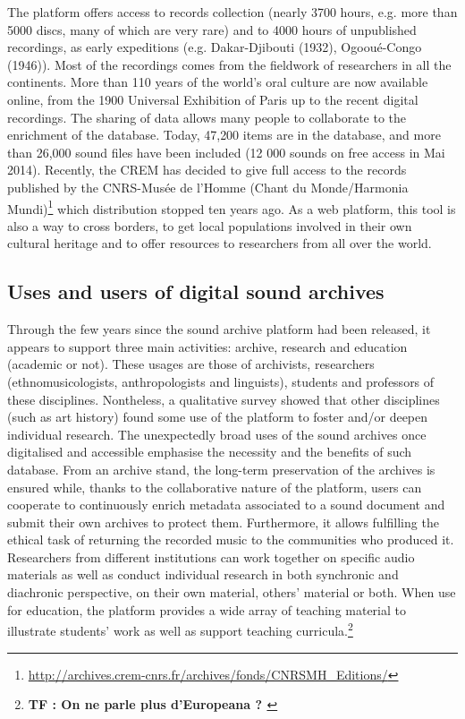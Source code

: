 \documentclass{sig-alternate}
\newcommand{\comment}[1]{\footnote{\color{red} \bf{{#1}}}}
\begin{document}
The platform offers access to records collection (nearly 3700 hours, e.g. more than 5000 discs, many of which are very rare) and to 4000 hours of unpublished recordings, as early expeditions (e.g. Dakar-Djibouti (1932), Ogooué-Congo (1946)). Most of the recordings comes from the fieldwork of researchers in all the continents. 
More than 110 years of the world's oral culture are now available online, from the 1900 Universal Exhibition of Paris up to the recent digital recordings. The sharing of data allows many people to collaborate to the enrichment of the database. Today, 47,200 items are in the database, and more than 26,000 sound files have been included (12 000 sounds on free access in Mai 2014). Recently, the CREM has decided to give full access to the records published by the CNRS-Musée de l’Homme (Chant du Monde/Harmonia Mundi)\footnote{\url{http://archives.crem-cnrs.fr/archives/fonds/CNRSMH_Editions/}} which distribution stopped ten years ago.
As a web platform, this tool is also a way to cross borders, to get local populations involved in their own cultural heritage and to offer resources to researchers from all over the world.

\subsection{Uses and users of digital sound archives}
     Through the few years since the sound archive platform had been released, it appears to support three main activities: archive, research and education (academic or not). These usages are those of archivists, researchers (ethnomusicologists, anthropologists and linguists), students and professors of these disciplines. Nontheless, a qualitative survey showed that other disciplines (such as art history) found some use of the platform to foster and/or deepen individual research. The unexpectedly broad uses of the sound archives once digitalised and accessible emphasise the necessity and the benefits of such database.
From an archive stand, the long-term preservation of the archives is ensured while, thanks to the collaborative nature of the platform, users can cooperate to continuously enrich metadata associated to a sound document and submit their own archives to protect them. Furthermore, it allows fulfilling the ethical task of returning the recorded music to the communities who produced it.
Researchers from different institutions can work together on specific audio materials as well as conduct individual research in both synchronic and diachronic perspective, on their own material, others’ material or both.
When use for education, the platform provides a wide array of teaching material to illustrate students’ work as well as support teaching curricula.\comment{TF : On ne parle plus d'Europeana ? }
\end{document}
